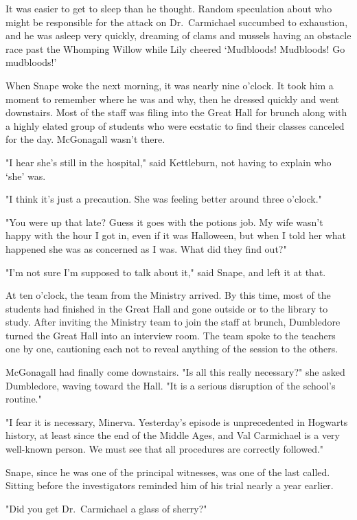 It was easier to get to sleep than he thought. Random speculation about who might be responsible for the attack on Dr.~Carmichael succumbed to exhaustion, and he was asleep very quickly, dreaming of clams and mussels having an obstacle race past the Whomping Willow while Lily cheered `Mudbloods! Mudbloods! Go{\el} mudbloods!'

When Snape woke the next morning, it was nearly nine o'clock. It took him a moment to remember where he was and why, then he dressed quickly and went downstairs. Most of the staff was filing into the Great Hall for brunch along with a highly elated group of students who were ecstatic to find their classes canceled for the day. McGonagall wasn't there.

"I hear she's still in the hospital," said Kettleburn, not having to explain who `she' was.

"I think it's just a precaution. She was feeling better around three o'clock."

"You were up that late? Guess it goes with the potions job. My wife wasn't happy with the hour I got in, even if it was Halloween, but when I told her what happened she was as concerned as I was. What did they find out?"

"I'm not sure I'm supposed to talk about it," said Snape, and left it at that.

At ten o'clock, the team from the Ministry arrived. By this time, most of the students had finished in the Great Hall and gone outside or to the library to study. After inviting the Ministry team to join the staff at brunch, Dumbledore turned the Great Hall into an interview room. The team spoke to the teachers one by one, cautioning each not to reveal anything of the session to the others.

McGonagall had finally come downstairs. "Is all this really necessary?" she asked Dumbledore, waving toward the Hall. "It is a serious disruption of the school's routine."

"I fear it is necessary, Minerva. Yesterday's episode is unprecedented in Hogwarts history, at least since the end of the Middle Ages, and Val Carmichael is a very well-known person. We must see that all procedures are correctly followed."

Snape, since he was one of the principal witnesses, was one of the last called. Sitting before the investigators reminded him of his trial nearly a year earlier.

"Did you get Dr.~Carmichael a glass of sherry?"

